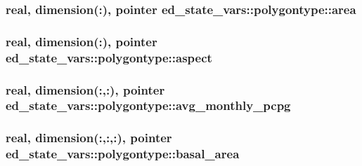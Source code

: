 \subsubsection[{\texorpdfstring{area}{area}}]{\setlength{\rightskip}{0pt plus 5cm}real, dimension(\+:), pointer ed\+\_\+state\+\_\+vars\+::polygontype\+::area}\hypertarget{structed__state__vars_1_1polygontype_a7eff8b746b03a9166df40c20d7983053}{}\label{structed__state__vars_1_1polygontype_a7eff8b746b03a9166df40c20d7983053}
\subsubsection[{\texorpdfstring{aspect}{aspect}}]{\setlength{\rightskip}{0pt plus 5cm}real, dimension(\+:), pointer ed\+\_\+state\+\_\+vars\+::polygontype\+::aspect}\hypertarget{structed__state__vars_1_1polygontype_ae6537b35e9d4482324fc025f55fac5f3}{}\label{structed__state__vars_1_1polygontype_ae6537b35e9d4482324fc025f55fac5f3}
\subsubsection[{\texorpdfstring{avg\+\_\+monthly\+\_\+pcpg}{avg_monthly_pcpg}}]{\setlength{\rightskip}{0pt plus 5cm}real, dimension(\+:,\+:), pointer ed\+\_\+state\+\_\+vars\+::polygontype\+::avg\+\_\+monthly\+\_\+pcpg}\hypertarget{structed__state__vars_1_1polygontype_a918aab56bb72fea95d57196cea86ae11}{}\label{structed__state__vars_1_1polygontype_a918aab56bb72fea95d57196cea86ae11}
\subsubsection[{\texorpdfstring{basal\+\_\+area}{basal_area}}]{\setlength{\rightskip}{0pt plus 5cm}real, dimension(\+:,\+:,\+:), pointer ed\+\_\+state\+\_\+vars\+::polygontype\+::basal\+\_\+area}\hypertarget{structed__state__vars_1_1polygontype_aca5e0482a88b91c98beeb2d9e5927fba}{}\label{structed__state__vars_1_1polygontype_aca5e0482a88b91c98beeb2d9e5927fba}

